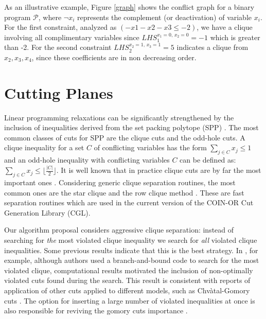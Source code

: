 \documentclass{endm}
\begin{document}
As an illustrative example, Figure \ref{graph} shows the conflict graph for a binary program $\mathcal{P}$, where $\neg x_i$ represents the complement (or deactivation) of variable $x_i$.  For the first constraint, analyzed as $(-x1-x2-x3\leq-2)$, we have a clique involving all complimentary variables since $LHS_1^{x_1=0,\, x_2=0}=-1$ which is greater than -2. For the second constraint $LHS_2^{x_2=1,\, x_3=1}=5$ indicates a clique from $x_2,x_3,x_4$, since these coefficients are in non decreasing order.

\section{Cutting Planes}\label{cut}

Linear programming relaxations can be significantly strengthened by the inclusion of inequalities derived from the set packing polytope (SPP) \cite {Padberg1973}. The most common classes of cuts for SPP are the clique cuts and the odd-hole cuts. A clique inequality for a set $C$ of conflicting variables has the form $\sum_{j\in C}x_{j} \leq 1$ and an odd-hole inequality with conflicting variables $C$ can be defined as: $\sum_{j\in C}x_{j} \leq \lfloor \frac{|C|}{2}\rfloor$. It is well known that in practice clique cuts are by far the most important ones \cite{Borndorfer1998}. Considering generic clique separation routines, the most common ones are the star clique and the row clique method \cite{Eso1999a,Hoffman1993,Borndorfer1998}. These are fast separation routines which are used in the current version of the COIN-OR\cite{LougeeHeimer2003} Cut Generation Library (CGL).  

Our algorithm proposal considers aggressive clique separation: instead of searching for \emph{the} most violated clique inequality we search for \emph{all} violated clique inequalities. Some previous results indicate that this is the best strategy. In \cite{Marecek2012}, for example, although authors used a branch-and-bound code to search for the most violated clique, computational results motivated the inclusion of non-optimally violated cuts found during the search. This result is consistent with reports of application of other cuts applied to different models, such as {C}hv\`{a}tal-Gomory cuts \cite{Fischetti2007}. The option for inserting a large number of violated inequalities at once is also responsible for reviving the gomory cuts importance \cite {Cornuejols2007}.
\end{document}
